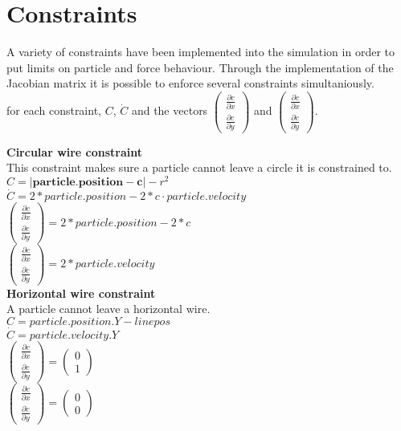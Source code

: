 \chapter{Constraints}
A variety of constraints have been implemented into the simulation in order to put limits on particle and force behaviour. Through the implementation of the Jacobian matrix it is possible to enforce several constraints simultaniously. \\
for each constraint, $C$, $\dot{C}$ and the vectors $\begin{pmatrix} \frac{\partial c}{\partial x} \\ \frac{\partial c}{\partial y}  \end{pmatrix}$ and $\begin{pmatrix} \frac{\partial\dot{c}}{\partial x} \\ \frac{\partial \dot{c}}{\partial y}  \end{pmatrix}$.

\smallskip
\textbf{Circular wire constraint} \\
This constraint makes sure a particle cannot leave a circle it is constrained to. \\
$C = |\boldsymbol{particle.position} - \boldsymbol{c}| - r^2$ 
$\dot{C} =2 * particle.position - 2 * c \cdot particle.velocity$ \\
$\begin{pmatrix} \frac{\partial c}{\partial x} \\ \frac{\partial c}{\partial y}  \end{pmatrix} = 2*particle.position - 2*c$ \\
$\begin{pmatrix} \frac{\partial\dot{c}}{\partial x} \\ \frac{\partial \dot{c}}{\partial y}  \end{pmatrix}= 2*particle.velocity$\\

\smallskip
\textbf{Horizontal wire constraint} \\
A particle cannot leave a horizontal wire. \\
$C = particle.position.Y -linepos$ \\
$\dot{C} = particle.velocity.Y$ \\
$\begin{pmatrix} \frac{\partial c}{\partial x} \\ \frac{\partial c}{\partial y}  \end{pmatrix} =\begin{pmatrix} 0 \\ 1  \end{pmatrix}$ \\
$\begin{pmatrix} \frac{\partial\dot{c}}{\partial x} \\ \frac{\partial \dot{c}}{\partial y}  \end{pmatrix}=\begin{pmatrix} 0 \\ 0  \end{pmatrix}$ \\

